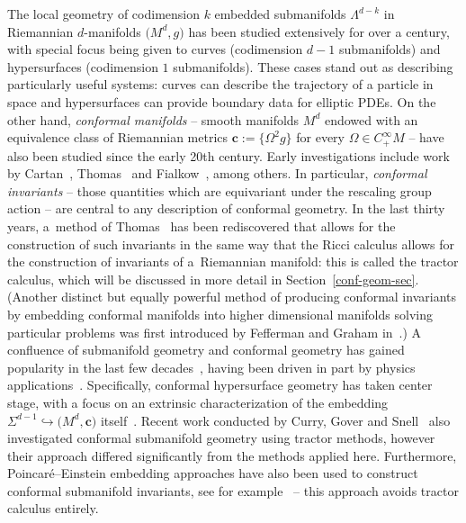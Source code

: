 \documentclass[10pt,a4paper]{article}
\numberwithin{equation}{section}
\newcommand{\cc}{\boldsymbol{c}}
\renewcommand{\=}{\stackrel \Lambda =}
\begin{document}
The local geometry of codimension $k$ embedded submanifolds $\Lambda^{d-k}$ in Riemannian $d$-manifolds $\bigl(M^d,g\bigr)$ has been studied extensively for over a century, with special focus being given to curves (codimension $d-1$ submanifolds) and hypersurfaces (codimension $1$ submanifolds). These cases stand out as describing particularly useful systems: curves can describe the trajectory of a particle in space and hypersurfaces can provide boundary data for elliptic PDEs. On the other hand, \textit{conformal manifolds} -- smooth manifolds $M^d$ endowed with an equivalence class of Riemannian metrics $\cc := \big\{\Omega^2 g\big\}$ for every $\Omega \in C^\infty_+ M$ -- have also been studied since the early 20th century. Early investigations include work by Cartan~\cite{CartanConformal}, Thomas~\cite{ThomasConformal} and Fialkow~\cite{Fialkow}, among others. In particular, \textit{conformal invariants} -- those quantities which are equivariant under the rescaling group action -- are central to any description of conformal geometry. In the last thirty years, a~method of Thomas~\cite{BEG} has been rediscovered that allows for the construction of such invariants in the same way that the Ricci calculus allows for the construction of invariants of a~Riemannian manifold: this is called the tractor calculus, which will be discussed in more detail in Section~\ref{conf-geom-sec}. (Another distinct but equally powerful method of producing conformal invariants by embedding conformal manifolds into higher dimensional manifolds solving particular problems was first introduced by Fefferman and Graham in~\cite{FGbook}.) A confluence of submanifold geometry and conformal geometry has gained popularity in the last few decades~\cite{Forms,WillB,GR,GZscatt,MondinoNguyen,SZ2019,Chang}, having been driven in part by physics applications~\cite{HS, Maldacena}. Specifically, conformal hypersurface geometry has taken center stage, with a focus on an extrinsic characterization of the embedding $\Sigma^{d-1} \hookrightarrow \bigl(M^d,\cc\bigr)$ itself~\cite{Will2,Will1}. Recent work conducted by Curry, Gover and Snell~\cite{RodSnellCurry} also investigated conformal submanifold geometry using tractor methods, however their approach differed significantly from the methods applied here. Furthermore, Poincar\'e--Einstein embedding approaches have also been used to construct conformal submanifold invariants, see for example~\cite{CGKTW} -- this approach avoids tractor calculus entirely.
\end{document}
